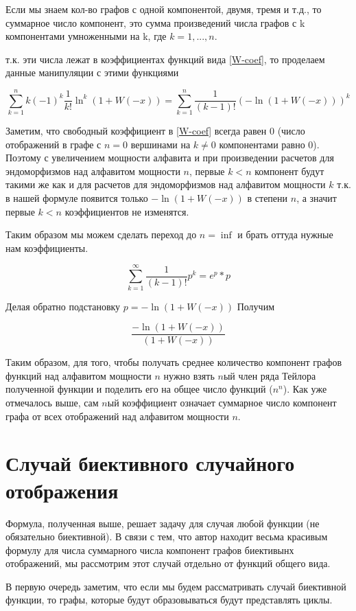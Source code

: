 \documentclass[10pt, a4paper]{report}
\begin{document}
Если мы знаем кол-во графов с одной компонентой, двумя, тремя и т.д., то суммарное число компонент, это сумма произведений числа графов с k компонентами умноженными на k, где $k=1,...,n$.

т.к. эти числа лежат в коэффициентах функций вида \eqref{W-coef}, то проделаем данные манипуляции с этими функциями

$$\sum_{k=1}^{n} k (-1)^k \frac 1 {k!} \ln^k(1+W(-x))= 
\sum_{k=1}^{n} \frac 1 {(k-1)!} (-\ln(1+W(-x)))^k
$$

Заметим, что свободный коэффициент в \eqref{W-coef} всегда равен 0 (число отображений в графе с $n=0$ вершинами на $k\ne0$ компонентами равно 0). Поэтому с увеличением мощности алфавита и при произведении расчетов для эндоморфизмов над алфавитом мощности $n$, первые $k<n$ компонент будут такими же как и для расчетов для эндоморфизмов над алфавитом мощности $k$ т.к. в нашей формуле появится только $-\ln(1+W(-x))$ в степени $n$, а значит первые $k<n$ коэффициентов не изменятся.

Таким образом мы можем сделать переход до $n=\inf$ и брать оттуда нужные нам коэффициенты.  

$$
\sum_{k=1}^{\infty} \frac 1 {(k-1)!} p^k=
e^p*p
$$

Делая обратно подстановку $p=-\ln(1+W(-x))$ Получим

$$
\frac {-\ln(1+W(-x))}{(1+W(-x))}
$$

Таким образом, для того, чтобы получать среднее количество компонент графов функций над алфавитом мощности $n$ нужно взять $n$ый член ряда Тейлора полученной функции и поделить его на общее число функций ($n^n$). Как уже отмечалось выше, сам $n$ый коэффициент означает суммарное число компонент графа от всех отображений над алфавитом мощности $n$.

\section{Случай биективного случайного отображения}

Формула, полученная выше, решает задачу для случая любой функции (не обязательно биективной). В связи с тем, что автор находит весьма красивым формулу для числа суммарного числа компонент графов биективынх отображений, мы рассмотрим этот случай отдельно от функций общего вида.

В первую очередь заметим, что если мы будем рассматривать случай биективной функции, то графы, которые будут образовываться будут представлять циклы.
\end{document}
